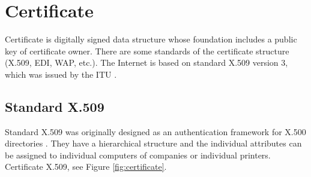 \documentclass[
  digital, %
  notable,   %
  lof,     %
  lot,     %
]{fithesis3}
\begin{document}
\section{Certificate}
Certificate is digitally signed data structure whose foundation includes a public key of
certificate owner. There are some standards of the certificate structure (X.509, EDI, WAP, 
etc.). The Internet is based on standard X.509 version 3, which was issued by the ITU \cite{dostalek2016velky}. %

\subsection{Standard X.509}
Standard X.509 was originally designed as an authentication framework for X.500 
directories \cite{schmeh2006cryptography}. They have a hierarchical structure and the 
individual attributes can be assigned to individual computers of companies or individual 
printers. %
Certificate X.509, see Figure \ref{fig:certificate}.
\end{document}
